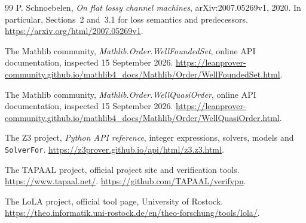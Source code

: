 \documentclass[11pt,a4paper]{article}
\theoremstyle{definition}
\newcommand{\code}[1]{\texttt{#1}}
\begin{document}
\begin{thebibliography}{99}
P. Schnoebelen, \emph{On flat lossy channel machines}, arXiv:2007.05269v1,
2020. In particular, Sections~2 and~3.1 for loss semantics and predecessors.
\url{https://arxiv.org/html/2007.05269v1}.

The Mathlib community, \emph{Mathlib.Order.WellFoundedSet}, online
API documentation, inspected 15 September 2026.
\url{https://leanprover-community.github.io/mathlib4_docs/Mathlib/Order/WellFoundedSet.html}.

The Mathlib community, \emph{Mathlib.Order.WellQuasiOrder}, online
API documentation, inspected 15 September 2026.
\url{https://leanprover-community.github.io/mathlib4_docs/Mathlib/Order/WellQuasiOrder.html}.

The Z3 project, \emph{Python API reference}, integer expressions, solvers,
models and \code{SolverFor}.
\url{https://z3prover.github.io/api/html/z3.z3.html}.

The TAPAAL project, official project site and verification tools.
\url{https://www.tapaal.net/}.
\url{https://github.com/TAPAAL/verifypn}.

The LoLA project, official tool page, University of Rostock.
\url{https://theo.informatik.uni-rostock.de/en/theo-forschung/tools/lola/}.
\end{thebibliography}
\endgroup
\end{document}
